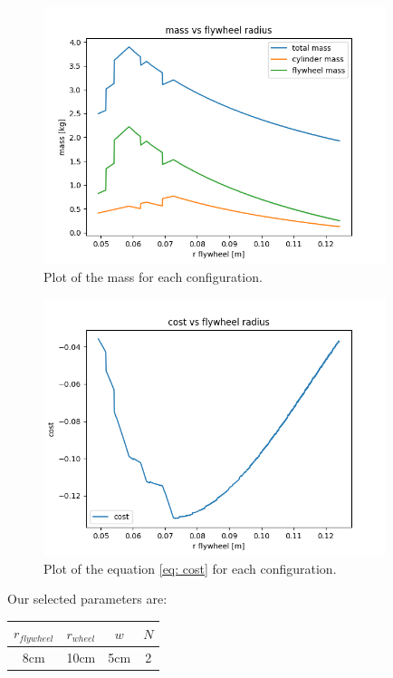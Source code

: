 \begin{figure}[H]
	\centering
	\includegraphics[width=10cm]{img/optimization/mass.png}
	\caption{Plot of the mass for each configuration.}
	\label{fig:Mass plot}
\end{figure}


\begin{figure}[H]
	\centering
	\includegraphics[width=10cm]{img/optimization/cost.png}
	\caption{Plot of the equation \ref{eq: cost} for each configuration.}
	\label{fig:Mass plot}
\end{figure}

Our selected parameters are:
\begin{center}
	\begin{tabular}{ |c|c|c|c| } 
	 \hline
	 $r_{flywheel}$ & $r_{wheel}$ & $w$ & $N$\\
	 \hline 
	 8cm & 10cm & 5cm & 2 \\ 
	 \hline
	\end{tabular}
\end{center}

